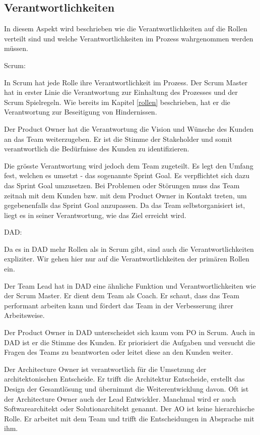 \subsection{Verantwortlichkeiten}

In diesem Aspekt wird beschrieben wie die Verantwortlichkeiten auf die Rollen verteilt sind und welche Verantwortlichkeiten im Prozess wahrgenommen werden müssen.

{\Large Scrum:}\cite{scrumResponsibilites} \medskip

In Scrum hat jede Rolle ihre Verantwortlichkeit im Prozess. Der Scrum Master hat in erster Linie die Verantwortung zur Einhaltung des Prozesses und der Scrum Spielregeln. Wie bereits im Kapitel \ref{rollen} beschrieben, hat er die Verantwortung zur Beseitigung von Hindernissen.

Der Product Owner hat die Verantwortung die Vision und Wünsche des Kunden an das Team weiterzugeben. Er ist die Stimme der Stakeholder und somit verantwortlich die Bedürfnisse des Kunden zu identifizieren.

Die grösste Verantwortung wird jedoch dem Team zugeteilt. Es legt den Umfang fest, welchen es umsetzt - das sogenannte Sprint Goal. Es verpflichtet sich dazu das Sprint Goal umzusetzen. Bei Problemen oder Störungen muss das Team zeitnah mit dem Kunden bzw. mit dem Product Owner in Kontakt treten, um gegebenenfalls das Sprint Goal anzupassen. Da das Team selbstorganisiert ist, liegt es in seiner Verantwortung, wie das Ziel erreicht wird.

\smallskip
{\Large DAD:}\cite{dadResponsibilites} \medskip

Da es in DAD mehr Rollen als in Scrum gibt, sind auch die Verantwortlichkeiten expliziter.
Wir gehen hier nur auf die Verantwortlichkeiten der primären Rollen ein.

Der Team Lead hat in DAD eine ähnliche Funktion und Verantwortlichkeiten wie der Scrum Master. Er dient dem Team als Coach. Er schaut, dass das Team performant arbeiten kann und fördert das Team in der Verbesserung ihrer Arbeitsweise.

Der Product Owner in DAD unterscheidet sich kaum vom PO in Scrum. Auch in DAD ist er die Stimme des Kunden. Er priorisiert die Aufgaben und versucht die Fragen des Teams zu beantworten oder leitet diese an den Kunden weiter.

Der Architecture Owner ist verantwortlich für die Umsetzung der architektonischen Entscheide. Er trifft die Architektur Entscheide, erstellt das Design der Gesamtlösung und übernimmt die Weiterentwicklung davon. Oft ist der Architecture Owner auch der Lead Entwickler. Manchmal wird er auch Softwarearchitekt oder Solutionarchitekt genannt. Der AO ist keine hierarchische Rolle. Er arbeitet mit dem Team und trifft die Entscheidungen in Absprache mit ihm.

